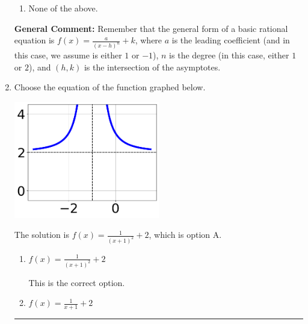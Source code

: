 \documentclass{extbook}[14pt]
\newcommand{\litem}[1]{\item #1

\rule{\textwidth}{0.4pt}}
\begin{document}
\begin{enumerate}
{\begin{enumerate}[label=\Alph*.]
\item None of the above.\end{enumerate}
\textbf{General Comment:} Remember that the general form of a basic rational equation is $ f(x) = \frac{a}{(x-h)^n} + k$, where $a$ is the leading coefficient (and in this case, we assume is either $1$ or $-1$), $n$ is the degree (in this case, either $1$ or $2$), and $(h, k)$ is the intersection of the asymptotes.
}
\litem{
Choose the equation of the function graphed below.

\begin{center}
    \includegraphics[width=0.5\textwidth]{../Figures/rationalGraphToEquationC.png}
\end{center}


The solution is \( f(x) = \frac{1}{(x + 1)^2} + 2 \), which is option A.\begin{enumerate}[label=\Alph*.]
\item \( f(x) = \frac{1}{(x + 1)^2} + 2 \)

This is the correct option.
\item \( f(x) = \frac{1}{x + 1} + 2 \)


\end{enumerate}}
\end{enumerate}
\end{document}
